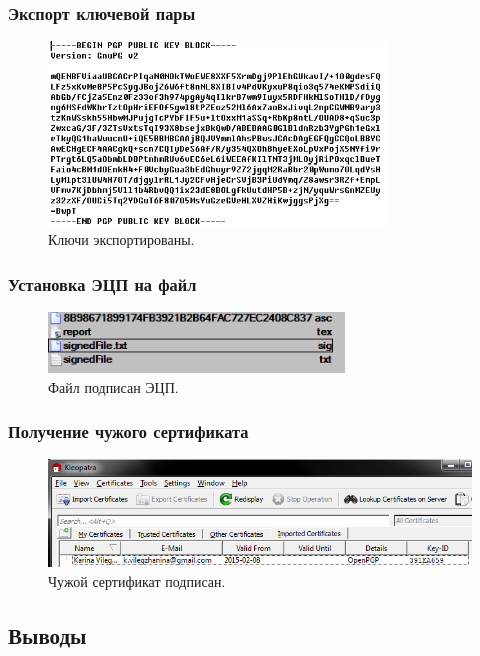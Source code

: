 \documentclass[a4paper, 14pt]{article}				%
\begin{document}
\subsubsection{Экспорт ключевой пары}
\begin{figure}[h!]
\centering
\includegraphics[width=0.8\textwidth]{fig9}
\caption{Ключи экспортированы.}
\end{figure}

\subsubsection{Установка ЭЦП на файл}
\begin{figure}[h!]
\centering
\includegraphics[width=0.7\textwidth]{fig10}
\caption{Файл подписан ЭЦП.}
\end{figure}

\subsubsection{Получение чужого сертификата}
\begin{figure}[h!]
\centering
\includegraphics[width=\textwidth]{fig11}
\caption{Чужой сертификат подписан.}
\end{figure}


\subsection{Выводы}
\end{document}
